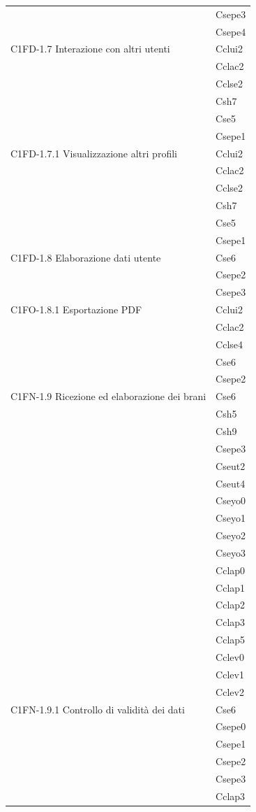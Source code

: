 \begin{footnotesize}
\begin{longtable}[!h]{|l|l|}
& Csepe3\\
& Csepe4\\\hline  
C1FD-1.7 Interazione con altri utenti & Cclui2\\
& Cclac2\\
& Cclse2\\
& Csh7\\
& Cse5\\
& Csepe1\\\hline     
C1FD-1.7.1 Visualizzazione altri profili & Cclui2\\
& Cclac2\\
& Cclse2\\
& Csh7\\
& Cse5\\
& Csepe1\\\hline  
C1FD-1.8 Elaborazione dati utente & Cse6\\
& Csepe2\\
& Csepe3\\\hline   
C1FO-1.8.1 Esportazione PDF & Cclui2\\
& Cclac2\\
& Cclse4\\
& Cse6\\
& Csepe2  \\\hline  
C1FN-1.9 Ricezione ed elaborazione dei brani & Cse6\\
& Csh5\\
& Csh9\\
& Csepe3\\
& Cseut2\\
& Cseut4\\
& Cseyo0\\
& Cseyo1\\
& Cseyo2\\
& Cseyo3\\
& Cclap0\\
& Cclap1\\
& Cclap2\\
& Cclap3\\
& Cclap5\\
& Cclev0\\
& Cclev1\\
& Cclev2\\\hline  
C1FN-1.9.1 Controllo di validit\`a dei dati & Cse6\\
& Csepe0\\
& Csepe1\\
& Csepe2\\
& Csepe3\\
& Cclap3\\\hline 

\end{longtable}
\end{footnotesize}
